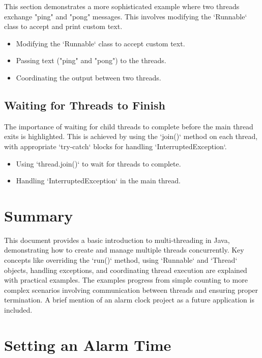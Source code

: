 \documentclass{article}
\begin{document}
\begin{itemize}
This section demonstrates a more sophisticated example where two threads exchange "ping" and "pong" messages.  This involves modifying the `Runnable` class to accept and print custom text.

\begin{itemize}
    \item Modifying the `Runnable` class to accept custom text.
    \item Passing text ("ping" and "pong") to the threads.
    \item Coordinating the output between two threads.
\end{itemize}


\subsection{Waiting for Threads to Finish}

The importance of waiting for child threads to complete before the main thread exits is highlighted.  This is achieved by using the `join()` method on each thread, with appropriate `try-catch` blocks for handling `InterruptedException`.

\begin{itemize}
    \item Using `thread.join()` to wait for threads to complete.
    \item Handling `InterruptedException` in the main thread.
\end{itemize}


\section{Summary}

This document provides a basic introduction to multi-threading in Java, demonstrating how to create and manage multiple threads concurrently.  Key concepts like overriding the `run()` method, using `Runnable` and `Thread` objects, handling exceptions, and coordinating thread execution are explained with practical examples.  The examples progress from simple counting to more complex scenarios involving communication between threads and ensuring proper termination.  A brief mention of an alarm clock project as a future application is included.


\section{Setting an Alarm Time}


\end{itemize}
\end{document}
